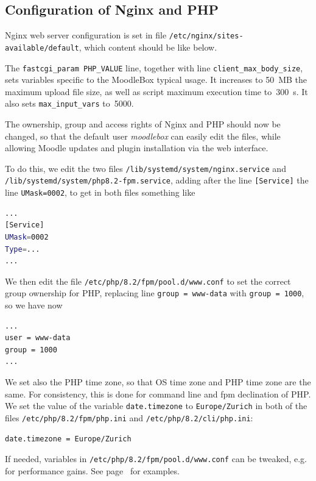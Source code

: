 \documentclass[12pt]{article}
\begin{document}
\subsection{Configuration of Nginx and PHP}\label{ssec-nginx-php}

Nginx web server configuration is set in file \lstinline{/etc/nginx/sites-available/default}, which content should be like below.


The \lstinline{fastcgi_param PHP_VALUE} line, together with line \lstinline{client_max_body_size}, sets variables specific to the MoodleBox typical usage.
It increases to 50~MB the maximum upload file size, as well as script maximum execution time to~300~s.
It also sets \lstinline{max_input_vars} to~5000.

The ownership, group and access rights of Nginx and PHP should now be changed, so that the default user \emph{moodlebox} can easily edit the files, while allowing Moodle updates and plugin installation via the web interface.

To do this, we edit the two files \lstinline{/lib/systemd/system/nginx.service} and \lstinline{/lib/systemd/system/php8.2-fpm.service}, adding after the line \lstinline{[Service]} the line \lstinline{UMask=0002}, to get in both files something like
\begin{lstlisting}[language=bash]
...
[Service]
UMask=0002
Type=...
...
\end{lstlisting}
We then edit the file \lstinline{/etc/php/8.2/fpm/pool.d/www.conf} to set the correct group ownership for PHP, replacing line \lstinline{group = www-data} with \lstinline{group = 1000}, so we have now
\begin{lstlisting}[language=bash]
...
user = www-data
group = 1000
...
\end{lstlisting}
We set also the PHP time zone, so that OS time zone and PHP time zone are the same.
For consistency, this is done for command line and fpm declination of PHP.
We set the value of the variable \lstinline{date.timezone} to \lstinline{Europe/Zurich} in both of the files \lstinline{/etc/php/8.2/fpm/php.ini} and \lstinline{/etc/php/8.2/cli/php.ini}:
\begin{lstlisting}[language=bash]
date.timezone = Europe/Zurich
\end{lstlisting}

If needed, variables in \lstinline{/etc/php/8.2/fpm/pool.d/www.conf} can be tweaked, e.g. for performance gains. See page~\pageref{ssec-php-optimisation} for examples.
\end{document}
